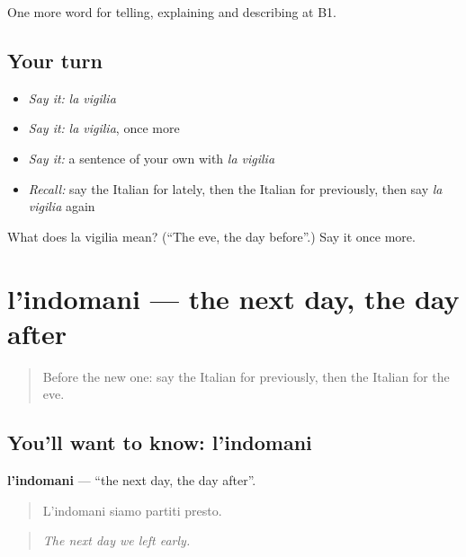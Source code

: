 \begin{grammarlens}[title={What you've built}]
One more word for telling, explaining and describing at B1.
\end{grammarlens}

\subsection*{Your turn}
\begin{itemize}
\raggedright
  \item \emph{Say it:} \emph{la vigilia}
  \item \emph{Say it:} \emph{la vigilia}, once more
  \item \emph{Say it:} a sentence of your own with \emph{la vigilia}
  \item \emph{Recall:} say the Italian for lately, then the Italian for previously, then say \emph{la vigilia} again
\end{itemize}

\begin{tcolorbox}[breakable,colback=teal!4,colframe=teal!35!black,title={Before you move on}]
What does la vigilia mean? (\textquotedblleft{}The eve, the day before\textquotedblright{}.) Say it once more.
\end{tcolorbox}
\section[l'indomani]{l'indomani — the next day, the day after}

\label{lesson:IT-C281-indomani}



\begin{quote}
Before the new one: say the Italian for previously, then the Italian for the eve.
\end{quote}

\subsection*{You'll want to know: l'indomani}
\textbf{l'indomani} — \textquotedblleft{}the next day, the day after\textquotedblright{}.

\begin{quote}
L'indomani siamo partiti presto.
\end{quote}

\begin{quote}
\emph{The next day we left early.}
\end{quote}

